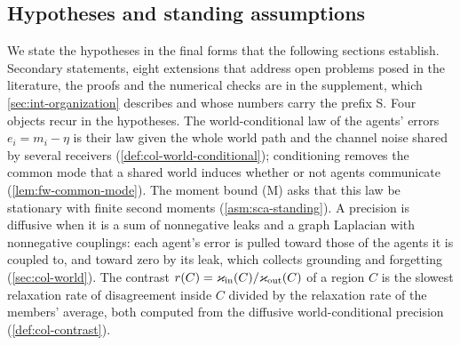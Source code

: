 \subsection{Hypotheses and standing assumptions}\label{sec:int-hypotheses}

We state the hypotheses in the final forms that the following sections establish. Secondary statements, eight extensions that address open problems posed in the literature, the proofs and the numerical checks are in the supplement, which \cref{sec:int-organization} describes and whose numbers carry the prefix S. Four objects recur in the hypotheses. The world-conditional law of the agents' errors $e_i=m_i-\eta$ is their law given the whole world path and the channel noise shared by several receivers (\cref{def:col-world-conditional}); conditioning removes the common mode that a shared world induces whether or not agents communicate (\cref{lem:fw-common-mode}). The moment bound (M) asks that this law be stationary with finite second moments (\cref{asm:sca-standing}). A precision is diffusive when it is a sum of nonnegative leaks and a graph Laplacian with nonnegative couplings: each agent's error is pulled toward those of the agents it is coupled to, and toward zero by its leak, which collects grounding and forgetting (\cref{sec:col-world}). The contrast $r(C)=\varkappa_{\mathrm{in}}(C)/\varkappa_{\mathrm{out}}(C)$ of a region $C$ is the slowest relaxation rate of disagreement inside $C$ divided by the relaxation rate of the members' average, both computed from the diffusive world-conditional precision (\cref{def:col-contrast}).

